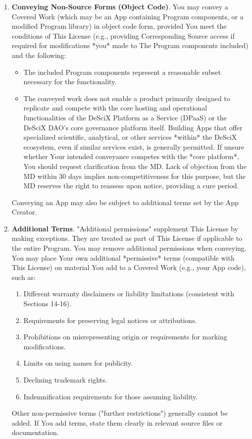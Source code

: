 \documentclass{article}
\begin{document}
\begin{enumerate}
        \item \textbf{Conveying Non-Source Forms (Object Code)}.
        You may convey a Covered Work (which may be an App containing Program components, or a modified Program library) in object code form, provided You meet the conditions of This License (e.g., providing Corresponding Source access if required for modifications *you* made to The Program components included) and the following:
        \begin{itemize}
            \item The included Program components represent a reasonable subset necessary for the functionality.
            \item The conveyed work does not enable a product primarily designed to replicate and compete with the core hosting and operational functionalities of the DeSciX Platform as a Service (DPaaS) or the DeSciX DAO's core governance platform itself. Building Apps that offer specialized scientific, analytical, or other services *within* the DeSciX ecosystem, even if similar services exist, is generally permitted. If unsure whether Your intended conveyance competes with the *core platform*, You should request clarification from the MD. Lack of objection from the MD within 30 days implies non-competitiveness for this purpose, but the MD reserves the right to reassess upon notice, providing a cure period.
        \end{itemize}
        Conveying an App may also be subject to additional terms set by the App Creator.

        \item \textbf{Additional Terms}.
        "Additional permissions" supplement This License by making exceptions. They are treated as part of This License if applicable to the entire Program. You may remove additional permissions when conveying. You may place Your own additional *permissive* terms (compatible with This License) on material You add to a Covered Work (e.g., your App code), such as:
        \begin{enumerate}
            \item Different warranty disclaimers or liability limitations (consistent with Sections 14-16).
            \item Requirements for preserving legal notices or attributions.
            \item Prohibitions on misrepresenting origin or requirements for marking modifications.
            \item Limits on using names for publicity.
            \item Declining trademark rights.
            \item Indemnification requirements for those assuming liability.
        \end{enumerate}
        Other non-permissive terms ("further restrictions") generally cannot be added. If You add terms, state them clearly in relevant source files or documentation.


\end{enumerate}
\end{document}
